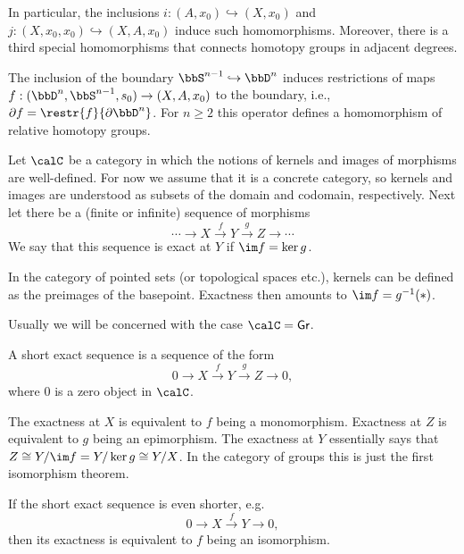 In particular, the inclusions $i:(A,x_0)\hookrightarrow(X,x_0)$ and $j:(X,x_0,x_0)\hookrightarrow (X,A,x_0)$ induce such homomorphisms. Moreover, there is a third special homomorphisms that connects homotopy groups in adjacent degrees.

\begin{defn}
    The inclusion of the boundary $\bbS^{n-1}\hookrightarrow \bbD^n$ induces restrictions of maps $f:(\bbD^n,\bbS^{n-1},s_0)\to (X,A,x_0)$ to the boundary, i.e., $\partial f=\restr{f}{\partial \bbD^n}$. For $n\geq 2$ this operator defines a homomorphism of relative homotopy groups.
\end{defn}

\begin{defn}
    Let $\calC$ be a category in which the notions of kernels and images of morphisms are well-defined. For now we assume that it is a concrete category, so kernels and images are understood as subsets of the domain and codomain, respectively. Next let there be a (finite or infinite) sequence of morphisms
    \[\cdots\to X\overset{f}{\to } Y\overset{g}{\to} Z\to \cdots \]
    We say that this sequence is exact at $Y$ if $\im f=\ker g$.
\end{defn}
\begin{example}
    In the category of pointed sets (or topological spaces etc.), kernels can be defined as the preimages of the basepoint. Exactness then amounts to $\im f=g^{-1}(*)$.

    Usually we will be concerned with the case $\calC=\mathsf{Gr}$.
\end{example}
\begin{defn}
    A short exact sequence is a sequence of the form
    \[0\to X\overset{f}{\to } Y\overset{g}{\to} Z\to 0,\]
    where $0$ is a zero object in $\calC$.

    The exactness at $X$ is equivalent to $f$ being a monomorphism. Exactness at $Z$ is equivalent to $g$ being an epimorphism. The exactness at $Y$ essentially says that $Z\cong Y\slash \im f=Y\slash \ker g\cong Y\slash X$. In the category of groups this is just the first isomorphism theorem.
\end{defn}

\begin{example}
    If the short exact sequence is even shorter, e.g.
    \[0\to X\overset{f}{\to } Y\to 0,\]
    then its exactness is equivalent to $f$ being an isomorphism.
\end{example}

